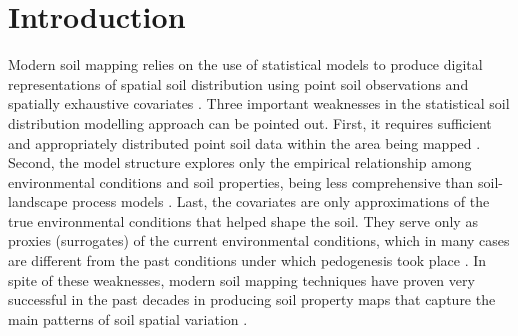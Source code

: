 \formatchapter

\section{Introduction}
\label{sec:chap05-intro}


Modern soil mapping relies on the use of statistical models to produce digital representations of spatial 
soil distribution using point soil observations and spatially exhaustive covariates \cite{McBratneyEtAl2003, 
ScullEtAl2003, Florinsky2012}. Three important weaknesses in the statistical soil distribution modelling 
approach can be pointed out. First, it requires sufficient and appropriately distributed point soil data within 
the area being mapped \cite{CarreEtAl2007a}. Second, the model structure explores only the empirical 
relationship among environmental conditions and soil properties, being less comprehensive than soil-landscape 
process models \cite{Grunwald2009}. Last, the covariates are only approximations of the true environmental 
conditions that helped shape the soil. They serve only as proxies (surrogates) of the current environmental 
conditions, which in many cases are different from the past conditions under which pedogenesis took place 
\cite{HeuvelinkEtAl2001}. In spite of these weaknesses, modern soil mapping techniques have proven very 
successful in the past decades in producing soil property maps that capture the main patterns of soil spatial 
variation \cite{MooreEtAl1993, McBratneyEtAl2000, Grunwald2009}.

